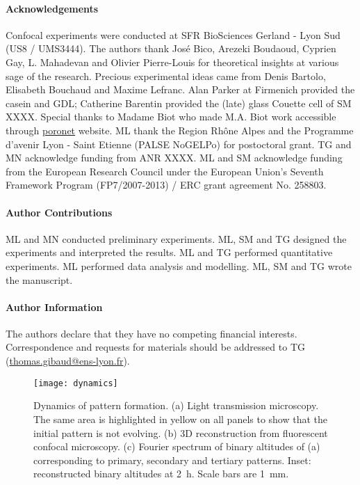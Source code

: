 \documentclass[twocolumn,superscriptaddress,showpacs,preprintnumbers,amsmath,amssymb,prl]{revtex4-1}
\begin{document}


\paragraph*{Acknowledgements}
Confocal experiments were conducted at SFR BioSciences Gerland - Lyon Sud (US8 / UMS3444).
The authors thank José Bico, Arezeki Boudaoud, Cyprien Gay, L. Mahadevan and Olivier Pierre-Louis for theoretical insights at various sage of the research. 
Precious experimental ideas came from Denis Bartolo, Elisabeth Bouchaud and Maxime Lefranc.
Alan Parker at Firmenich provided the casein and GDL; Catherine Barentin provided the (late) glass Couette cell of SM XXXX.
Special thanks to Madame Biot who made M.A. Biot work accessible through \href{http://www.olemiss.edu/sciencenet/poronet/}{poronet} website. 
ML thank the Region Rhône Alpes and the Programme d'avenir Lyon - Saint Etienne (PALSE NoGELPo) for postoctoral grant. 
TG and MN acknowledge funding from ANR XXXX. 
ML and SM acknowledge funding from the European Research Council under the European Union's Seventh Framework Program (FP7/2007-2013) / ERC grant agreement No. 258803.


\paragraph*{Author Contributions}
ML and MN conducted preliminary experiments. ML, SM and TG designed the experiments and interpreted the results. ML and TG performed quantitative experiments. ML performed data analysis and modelling. ML, SM and TG wrote the manuscript.


\paragraph*{Author Information} 
The authors declare that they have no competing financial interests. 
Correspondence and requests for materials should be addressed to TG (\href{mailto:thomas.gibaud@ens-lyon.fr}{thomas.gibaud@ens-lyon.fr}).



\begin{figure}
	\texttt{[image: dynamics]}
	\caption{Dynamics of pattern formation. (a) Light transmission microscopy. The same area is highlighted in yellow on all panels to show that the initial pattern is not evolving. (b) 3D reconstruction from fluorescent confocal microscopy. (c) Fourier spectrum of binary altitudes of (a) corresponding to primary, secondary and tertiary patterns. Inset: reconstructed binary altitudes at \SI{2}{\hour}. Scale bars are \SI{1}{\milli\metre}.}
	\label{fig:dynamics}
\end{figure}
\end{document}
